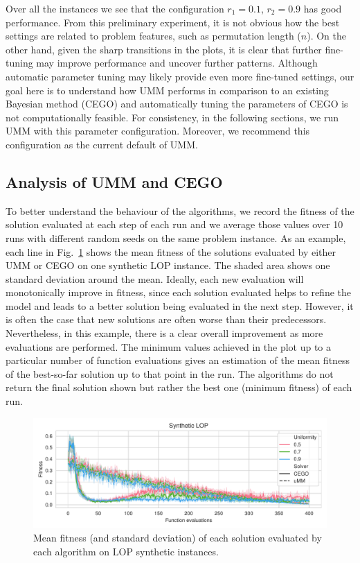 \documentclass[runningheads]{llncs}
\begin{document}
Over all the instances  we
see that the configuration $r_1 =0.1$, $r_2=0.9$ has good
performance. From this
preliminary experiment, it is not obvious how the best settings are related to
problem features, such as permutation length ($n$). On the other hand, given
the sharp transitions in the plots, it is clear that further fine-tuning may
improve performance and uncover further patterns.  Although automatic parameter
tuning may likely provide even more fine-tuned settings, our goal here is to
understand how UMM performs in comparison to an existing Bayesian method (CEGO)
and automatically tuning the parameters of CEGO is not computationally
feasible.  For consistency, in the following sections, we run UMM with this
parameter configuration. Moreover, we recommend this configuration as the
current default of UMM.

\subsection{Analysis of UMM and CEGO}

To better understand the behaviour of the algorithms, we record the fitness of
the solution evaluated at each step of each run and we average those values
over 10 runs with different random seeds on the same problem instance.  As an example, each line in Fig.~\ref{fig:lop_synth} 
shows the mean fitness of the solutions evaluated by either UMM or CEGO on one synthetic LOP
instance. The shaded area shows one standard deviation around the
mean. Ideally, each new evaluation will monotonically improve in fitness, since each solution evaluated helps to refine the model and leads to a
better solution being evaluated in the next step.  However, it is often the case that 
new solutions
are often worse than their predecessors. Nevertheless, in this example, there
is a clear overall improvement as more evaluations are performed. The minimum
values achieved in the plot up to a particular number of function evaluations
gives an estimation of the mean fitness of the best-so-far solution up to that
point in the run. The algorithms do not return the final solution shown but
rather the best one (minimum fitness) of each run.


\begin{figure}[tb]
  \centering%
  \includegraphics[width=\textwidth]{../img/synthetic_LOP_combined}
  \caption{Mean fitness  (and standard deviation)  of each solution evaluated by each algorithm on LOP synthetic instances.\label{fig:lop_synth}}
\end{figure}
\end{document}
